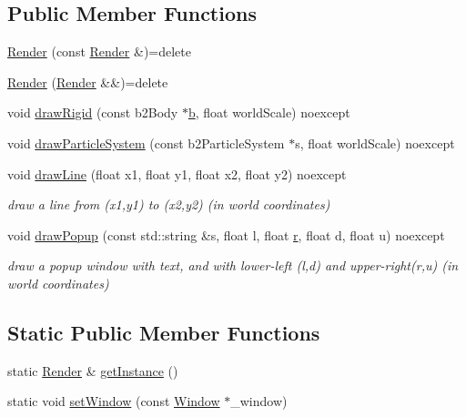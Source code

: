\subsection*{Public Member Functions}
\begin{DoxyCompactItemize}
\item 
\hyperlink{classRender_a9efce92fa87e96980f4e413ee0cb6843}{Render} (const \hyperlink{classRender}{Render} \&)=delete
\item 
\hyperlink{classRender_a6e1a004027eff97cb3dfc9f012dde498}{Render} (\hyperlink{classRender}{Render} \&\&)=delete
\item 
void \hyperlink{classRender_a18f55be699e0bd8d20a5462330d5c9df}{draw\+Rigid} (const b2\+Body $\ast$\hyperlink{image_8h_ab2d05693952610f937e5acb3c4a8fa1b}{b}, float world\+Scale) noexcept
\item 
void \hyperlink{classRender_a14b83adbf9e351b9f11383abeef2ca63}{draw\+Particle\+System} (const b2\+Particle\+System $\ast$s, float world\+Scale) noexcept
\item 
void \hyperlink{classRender_a4f2ee414b80bf5e1e1ffcfe80c33218a}{draw\+Line} (float x1, float y1, float x2, float y2) noexcept
\begin{DoxyCompactList}\small\item\em draw a line from (x1,y1) to (x2,y2) (in world coordinates) \end{DoxyCompactList}\item 
void \hyperlink{classRender_ac30bcc966a9aa9de650a80cbfc600bb1}{draw\+Popup} (const std\+::string \&s, float l, float \hyperlink{image_8h_a62969232668331297e2dca1ae2ddd10d}{r}, float d, float u) noexcept
\begin{DoxyCompactList}\small\item\em draw a popup window with text, and with lower-\/left (l,d) and upper-\/right(r,u) (in world coordinates) \end{DoxyCompactList}\end{DoxyCompactItemize}
\subsection*{Static Public Member Functions}
\begin{DoxyCompactItemize}
\item 
static \hyperlink{classRender}{Render} \& \hyperlink{classRender_add2a1980ba1c0d0bce85943405f87c68}{get\+Instance} ()
\item 
static void \hyperlink{classRender_ae6344724a34c4ec00fc3f9de97a7cdb6}{set\+Window} (const \hyperlink{classWindow}{Window} $\ast$\+\_\+window)
\end{DoxyCompactItemize}


